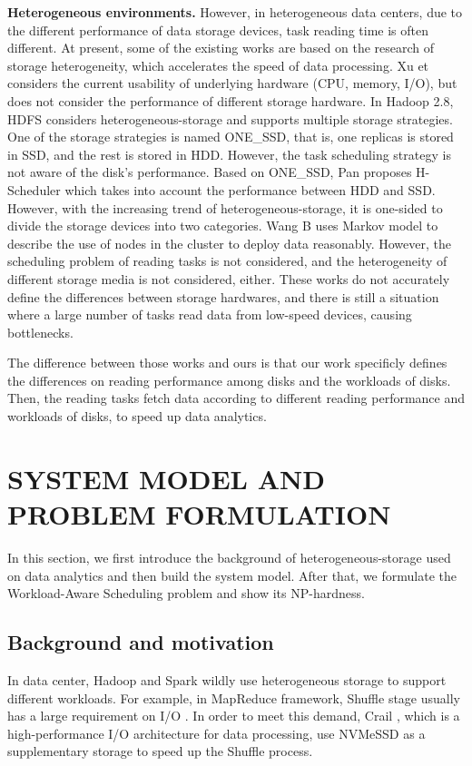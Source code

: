 \documentclass[conference]{IEEEtran}
\begin{document}
\textbf{Heterogeneous environments.} However, in heterogeneous data centers, due to the different performance of data storage devices, task reading time is often different. At present, some of the existing works are based on the research of storage heterogeneity, which accelerates the speed of data processing. Xu et \cite{b6} considers the current usability of underlying hardware (CPU, memory, I/O), but does not consider the performance of different storage hardware. 
In Hadoop 2.8, HDFS\cite{b19} considers heterogeneous-storage and supports multiple storage strategies. One of the storage strategies is named ONE\_SSD, that is, one replicas is stored in SSD, and the rest is stored in HDD. However, the task scheduling strategy is not aware of the disk's performance.
Based on ONE\_SSD, Pan \cite{b7} proposes H-Scheduler which takes into account the performance between HDD and SSD. However, with the increasing trend of heterogeneous-storage, it is one-sided to divide the storage devices into two categories. Wang B \cite{b8} uses Markov model to describe the use of nodes in the cluster to deploy data reasonably. However, the scheduling problem of reading tasks is not considered, and the heterogeneity of different storage media is not considered, either. These works do not accurately define the differences between storage hardwares, and there is still a situation where a large number of tasks read data from low-speed devices, causing bottlenecks.

The difference between those works and ours is that our work specificly defines the differences on reading performance among disks and the workloads of disks. Then, the reading tasks fetch data according to different reading performance and workloads of disks, to speed up data analytics.

\section{SYSTEM MODEL AND PROBLEM FORMULATION}\label{SYSTEM_MODEL}
In this section, we first introduce the background of heterogeneous-storage used on data analytics and then build the system model. After that, we formulate the Workload-Aware Scheduling problem and show its NP-hardness. 

\subsection{Background and motivation}\label{AA}

In data center, Hadoop and Spark wildly use heterogeneous storage to support different workloads. For example, in MapReduce framework, Shuffle \cite{b42} \cite{b41} stage usually has a large requirement on I/O . In order to meet this demand, Crail \cite{b37}, which is a high-performance I/O architecture for data processing, use NVMeSSD as a supplementary storage to speed up the Shuffle process.
\end{document}
